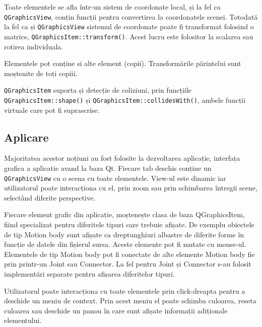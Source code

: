 \begin{itemize}
    Toate elementele se afla într-un sistem de coordonate local, și la fel ca \verb|QGraphicsView|, conțin funcții pentru 
    convertirea la coordonatele scenei. Totodată la fel ca și \verb|QGraphicsView| sistemul de coordonate poate fi transformat 
    folosind o matrice, \verb|QGraphicsItem::transform()|. Acest lucru este folositor la scalarea sau rotirea individuala.\newline

    Elementele pot conține si alte element (copii). Transformările părintelui sunt moștenite de toți copiii.\newline
    
    \verb|QGraphicsItem| suporta și detecție de coliziuni, prin funcțiile \verb|QGraphicsItem::shape()| și \verb|QGraphicsItem::collidesWith()|, 
    ambele funcții virtuale care pot fi suprascrise.\newline
\end{itemize}

\subsection{Aplicare}

Majoritatea acestor noțiuni au fost folosite la dezvoltarea aplicație, interfața grafica a aplicatie avand la baza Qt. 
Fiecare tab deschis conține un \verb|QGraphicsView| cu o scena cu toate elementele. 
View-ul este dinamic iar utilizatorul poate interacționa cu el, prin zoom sau prin schimbarea întregii scene, 
selectând diferite perspective.\newline 

Fiecare element grafic din aplicație, moștenește clasa de baza QGraphicsItem, 
fiind specializat pentru diferitele tipuri care trebuie afișate. De exemplu obiectele de tip Motion body sunt 
afișate ca dreptunghiuri albastre de diferite forme în funcție de datele din fișierul sursa. Aceste elemente 
pot fi mutate cu mouse-ul. Elementele de tip Motion body pot fi conectate de alte elemente Motion body fie prin 
printr-un Joint sau Connector. La fel pentru Joint și Connector s-au folosit implementări separate pentru afișarea 
diferitelor tipuri.\newline 

Utilizatorul poate interacționa cu toate elementele prin click-dreapta pentru a deschide un meniu de context. 
Prin acest meniu el poate schimba culoarea, reseta culoarea sau deschide un panou în care sunt afișate informații adiționale 
elementului.\newline






